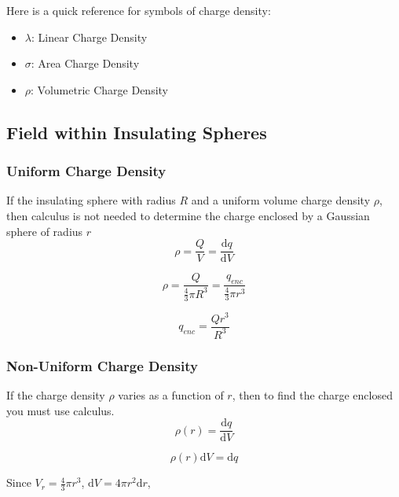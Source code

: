 \documentclass[a4paper,12pt]{article}
\begin{document}
				Here is a quick reference for symbols of charge density:
				\begin{itemize}
						\item $\lambda$: Linear Charge Density
						\item $\sigma$: Area Charge Density
						\item $\rho$: Volumetric Charge Density
				\end{itemize}
				\subsection{Field within Insulating Spheres}
						\subsubsection{Uniform Charge Density}
								If the insulating sphere with radius $R$ and a uniform volume charge density $\rho$, then calculus is not needed to determine the charge enclosed by a Gaussian sphere of radius $r$
								\begin{equation*}
										\rho = \frac{Q}{V} = \frac{\mathrm{d}q}{\mathrm{d}V} 
								\end{equation*}

								\begin{equation*}
										\rho = \frac{Q}{\frac{4}{3}\pi R^{3}} = \frac{q_{enc}}{\frac{4}{3}\pi r^{3}}
								\end{equation*}

								\begin{equation*}
										q_{enc} = \frac{Qr^{3}}{R^{3}}
								\end{equation*}
						\subsubsection{Non-Uniform Charge Density}
								If the charge density $\rho$ varies as a function of $r$, then to find the charge enclosed you must use calculus.					
								\begin{equation*}
										\rho(r) = \frac{\mathrm{d}q}{\mathrm{d}V} 
								\end{equation*}

								\begin{equation*}
										\rho(r) \mathrm{d}V = \mathrm{d}q 
								\end{equation*}

								Since $V_{r} = \frac{4}{3}\pi r^{3}$, $\mathrm{d}V = 4 \pi r^{2} \mathrm{d}r$,
\end{document}
